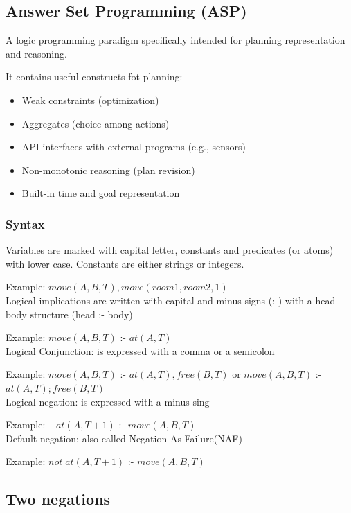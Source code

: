 \subsection{Answer Set Programming (ASP)}
A logic programming paradigm specifically intended for planning representation and reasoning.

It contains useful constructs fot planning:
\begin{itemize}
    \item Weak constraints (optimization)
    \item Aggregates (choice among actions)
    \item API interfaces with external programs (e.g., sensors)
    \item Non-monotonic reasoning (plan revision)
    \item Built-in time and goal representation
\end{itemize}

\subsubsection{Syntax}
Variables are marked with capital letter, constants and predicates (or atoms) with lower case.
Constants are either strings or integers.

Example: $move(A, B, T), move(room1, room2, 1)$\\

Logical implications are written with capital and minus signs (:-) with a head body structure (head :- body) 

Example: $move(A, B, T)$ :- $at(A, T)$\\

Logical Conjunction: is expressed with a comma or a semicolon

Example: $move(A, B, T)$ :- $at(A, T), free(B, T)$ or $move(A, B, T)$ :- $at(A, T); free(B, T)$\\

Logical negation: is expressed with a minus sing

Example: $-at(A, T+1)$ :- $move(A, B, T)$\\

Default negation: also called Negation As Failure(NAF)

Example: $not\;at(A, T+1)$ :- $move(A, B, T)$\\

\subsection{Two negations}


